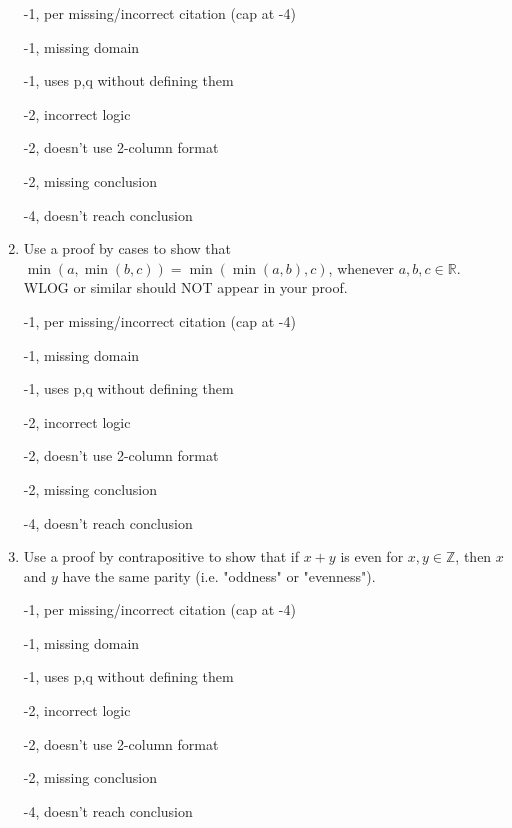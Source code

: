 \begin{enumerate}
\begin{rubric}
-1, per missing/incorrect citation (cap at -4)

-1, missing domain

-1, uses p,q without defining them

-2, incorrect logic

-2, doesn't use 2-column format

-2, missing conclusion

-4, doesn't reach conclusion
\end{rubric}

\item Use a proof by cases to show that $\min(a, \min(b,c)) = \min(\min(a,b),c)$, whenever $a,b,c \in \mathbb{R}$. WLOG or similar should NOT appear in your proof. 

\begin{rubric}
-1, per missing/incorrect citation (cap at -4)

-1, missing domain

-1, uses p,q without defining them

-2, incorrect logic

-2, doesn't use 2-column format

-2, missing conclusion

-4, doesn't reach conclusion
\end{rubric}

\item Use a proof by contrapositive to show that if $x+y$ is even for $x,y \in \mathbb{Z}$, then $x$ and $y$ have the same parity (i.e. "oddness" or "evenness"). 

\begin{rubric}
-1, per missing/incorrect citation (cap at -4)

-1, missing domain

-1, uses p,q without defining them

-2, incorrect logic

-2, doesn't use 2-column format

-2, missing conclusion

-4, doesn't reach conclusion
\end{rubric}

\end{enumerate}